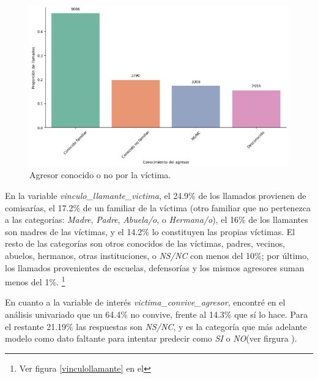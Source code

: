 \documentclass[10 pt]{article}
\begin{document}
    \begin{figure}[H]
        \begin{center}
        \includegraphics[scale=.5]{images/latex_agresor_conocido_no.png}
        \caption{Agresor conocido o no por la víctima.}
        \label{conocidodesconocido}
        \end{center}
        \end{figure}




 En la variable \textit{vinculo\_llamante\_victima}, el 24.9\% de los llamados provienen de comisarías, el 17.2\% de un familiar de la víctima (otro familiar que no pertenezca a las categorías: \textit{Madre}, \textit{Padre}, \textit{Abuela/o}, o \textit{Hermana/o}), el 16\% de los llamantes son madres de las víctimas, y el 14.2\% lo constituyen las propias víctimas. El resto de las categorías son otros conocidos de las víctimas, padres, vecinos, abuelos, hermanos, otras instituciones, o \textit{NS/NC} con menos del 10\%; por último, los llamados provenientes de escuelas, defensorías y los mismos agresores suman menos del 1\%.  \footnote{Ver figura \ref{vinculollamante} en el } 



En cuanto a la variable de interés \textit{victima\_convive\_agresor}, encontré en el análisis univariado que un 64.4\% no convive, frente al 14.3\% que sí lo hace. Para el restante 21.19\% las respuestas son \textit{NS/NC}, y es la categoría que más adelante modelo como dato faltante para intentar predecir como \textit{SI} o \textit{NO}(ver firgura ).  
\end{document}
